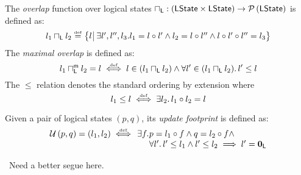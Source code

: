 %
\begin{definition}[Overlap]
The \emph{overlap} function over logical states 
%
$
\sqcap_{\textsf{L}} : \left(\textsf{LState} \times \textsf{LState} \right) \rightarrow \mathcal{P}\left(\textsf{LState} \right)
$
%
is defined as:
%
\[
	l_1 \meetL l_2 \eqdef 
	\left\{ 
	\begin{array}{@{}l|l@{}}
	 	l 
	 	\!\!&\!
	  \exsts{l', l'', l_3}\! l_1 = l \composeL l' \land l_2 = l \composeL l'' \land l \composeL l' \composeL l'' = l_3 
	\end{array}
	\right\}
\]
%
The \emph{maximal overlap} is defined as:
%
\[
	l_1 \sqcap_{\textsf{L}}^{\textsf{m}} l_2 = l \mathrel{\stackrel{\smash{\scriptscriptstyle{\mathrm{def}}}}{\iff}} l \in (l_1 \sqcap_{\textsf{L}} l_2) \land \forall l' \in (l_1 \sqcap_{\textsf{L}} l_2).\, l' \leq l
\]
%
The $\leq$ relation denotes the standard ordering by extension where 
%
\[
	l_1 \leq l \mathrel{\stackrel{\smash{\scriptscriptstyle{\mathrm{def}}}}{\iff}} \exists l_2.\, l_1 \circ l_2 = l
\]
%
\end{definition}
%
%
\begin{definition}
Given a pair of logical states $(p, q)$, its \emph{update footprint} is defined as:
%
\[
\begin{array}{l l l}
	\updateFP{p,q} = (l_1, l_2) \iffdef  
	&\hspace*{-0.2cm}	\exsts{f}\hspace*{-0.2cm}
	&\hspace*{-0.2cm} p = l_1 \composeL f \land q = l_2 \composeL f \land\\
	\hspace*{-0.2cm}
	&\hspace*{-0.2cm}&
	\hspace*{-0.2cm}\for{l'} l' \leq l_1 \land l' \leq l_2 \implies l' = \unitL
\end{array}
\]
%
\end{definition}
\todo\ Need a better segue here.\\
%

